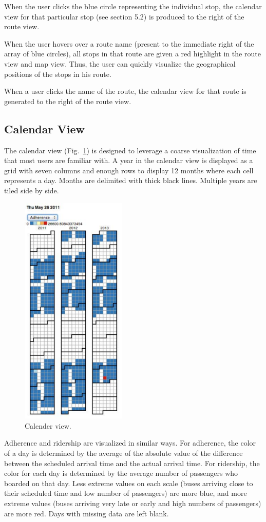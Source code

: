 \documentclass[journal]{vgtc}                %
\begin{document}
When the user clicks the blue circle representing the individual stop, the calendar view for that particular stop (see section 5.2) is produced to the right of the route view. 

When the user hovers over a route name (present to the immediate right of the array of blue circles), all stops in that route are given a red highlight in the route view and map view. Thus, the user can quickly visualize the geographical positions of the stops in his route.

When a user clicks the name of the route, the calendar view for that route is generated to the right of the route view. 

\subsection{Calendar View}
The calendar view (Fig.~\ref{calendar_view}) is designed to leverage a coarse visualization of time that most users are familiar with. A year in the calendar view is displayed as a grid with seven columns and enough rows to display 12 months where each cell represents a day. Months are delimited with thick black lines. Multiple years are tiled side by side.

\begin{figure}[htb]
 \centering
 \includegraphics[width=5cm]{img/image02}
 \caption{Calender view.}
 \label{calendar_view}
\end{figure}

Adherence and ridership are visualized in similar ways. For adherence, the color of a day is determined by the average of the absolute value of the difference between the scheduled arrival time and the actual arrival time. For ridership, the color for each day is determined by the average number of passengers who boarded on that day. Less extreme values on each scale (buses arriving close to their scheduled time and low number of passengers) are more blue, and more extreme values (buses arriving very late or early and high numbers of passengers) are more red. Days with missing data are left blank.
\end{document}
